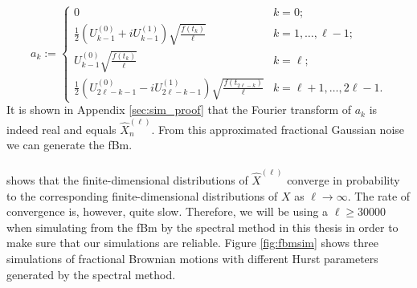\documentclass{article}
\begin{document}
\[
a_k := \begin{cases}
0 & k = 0; \\
\frac{1}{2} \left( U^{(0)}_{k-1} + i U^{(1)}_{k-1} \right) \sqrt{\frac{f(t_k)}{\ell}} & k = 1, \dots, \ell - 1; \\
U^{(0)}_{k-1} \sqrt{\frac{f(t_k)}{\ell}} & k = \ell; \\
\frac{1}{2} \left( U^{(0)}_{2\ell - k - 1} - i U^{(1)}_{2\ell - k - 1} \right) \sqrt{\frac{f(t_{2\ell - k})}{\ell}} & k = \ell + 1, \dots, 2\ell - 1.
\end{cases}
\]
It is shown in Appendix \ref{sec:sim_proof} that the Fourier transform of $a_k$ is indeed real and equals $\hat{X}_n^{(\ell)}$. From this approximated fractional Gaussian noise we can generate the fBm. \\\\
\cite{dieker} shows that the finite-dimensional distributions of $\hat{X}^{(\ell)}$ converge in probability to the corresponding finite-dimensional distributions of $X$ as $\ell\rightarrow \infty$. The rate of convergence is, however, quite slow. Therefore, we will be using a $\ell \geq 30000$ when simulating from the fBm by the spectral method in this thesis in order to make sure that our simulations are reliable. Figure \ref{fig:fbmsim} shows three simulations of fractional Brownian motions with different Hurst parameters generated by the spectral method. 
\end{document}
